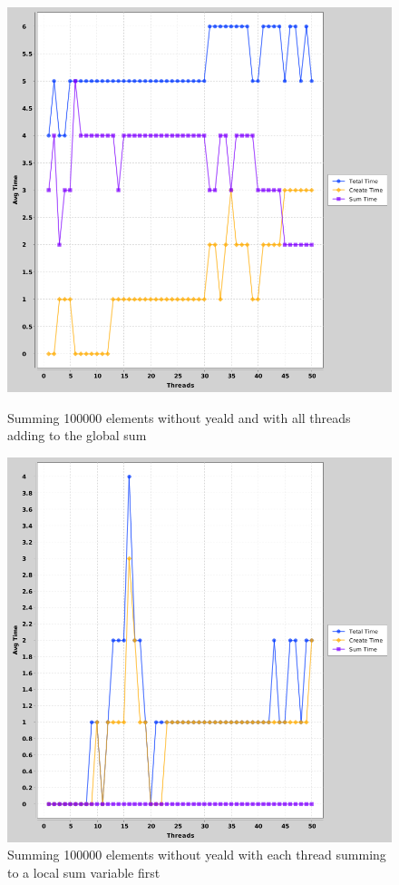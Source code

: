\documentclass[a4paper, 12pt]{article}
\begin{document}
		\begin{figure}[H]
  \includegraphics[width=\linewidth]{threads-vs-time-100000-global-noyield.png}
  \caption{Summing 100000 elements without yeald and with all threads adding to the global sum}
\endminipage\hfill {}
  \includegraphics[width=\linewidth]{threads-vs-time-100000-local-noyield.png}
  \caption{Summing 100000 elements without yeald with each thread summing to a local sum variable first}
\endminipage\hfill
		\end{figure}		
	
\end{document}
